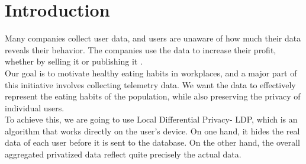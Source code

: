 \documentclass[sigconf]{acmart}
\begin{document}
\section{Introduction}
Many companies collect user data, and users are unaware of how much their data reveals their behavior. The companies use the data to increase their profit, whether by selling it or publishing it \cite{riederer2011sale}.\\
Our goal is to motivate healthy eating habits in workplaces, and a major part of this initiative involves collecting telemetry data. We want the data to effectively represent the eating habits of the population, while also preserving the privacy of individual users.\\
To achieve this, we are going to use Local Differential Privacy- LDP, which is an algorithm that works directly on the user's device. On one hand, it hides the real data of each user before it is sent to the database. On the other hand, the overall aggregated privatized data reflect quite precisely the actual data.
\end{document}
